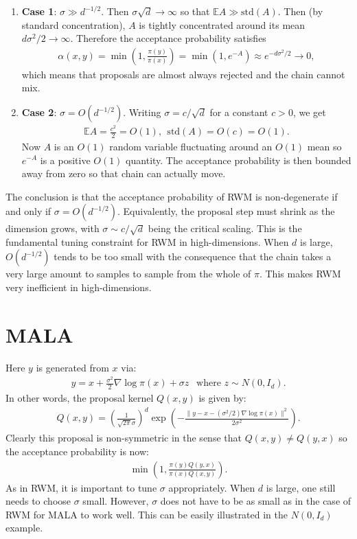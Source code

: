 \documentclass{scrartcl}
\newcommand{\E}{{\mathbb E}}
\begin{document}
\begin{enumerate}
\item \textbf{Case 1}: $\sigma \gg d^{-1/2}$. Then $\sigma \sqrt{d}
  \rightarrow \infty$ so that $\E A \gg \text{std}(A)$. Then (by
  standard concentration), $A$ is tightly concentrated around its mean
  $d\sigma^2/2 \rightarrow \infty$. Therefore the acceptance
  probability satisfies
  \begin{align*}
    \alpha(x, y) = \min \left(1, \frac{\pi(y)}{\pi(x)} \right) = \min
    \left(1, e^{-A} \right) \approx e^{-d\sigma^2/2} \rightarrow 0, 
  \end{align*}
  which means that proposals are almost always rejected and the chain
  cannot mix.
\item \textbf{Case 2}: $\sigma = O(d^{-1/2})$. Writing $\sigma =
  c/\sqrt{d}$ for a constant $c > 0$, we get
  \begin{align*}
    \E A = \frac{c^2}{2} = O(1), ~~ \text{std}(A) = O(c) = O(1). 
  \end{align*}
  Now $A$ is an $O(1)$ random variable fluctuating around an $O(1)$
  mean so $e^{-A}$ is a positive $O(1)$ quantity. The acceptance
  probability is then bounded away from zero so that chain can
  actually move. 
\end{enumerate}
The conclusion is that the acceptance probability of RWM is
non-degenerate if and only if $\sigma = O(d^{-1/2})$. Equivalently,
the proposal step must shrink as the dimension grows, with $\sigma
\sim c/\sqrt{d}$ being the critical scaling. This is the fundamental
tuning constraint for RWM in high-dimensions. When $d$ is large,
$O(d^{-1/2})$ tends to be too small with the consequence that the
chain takes a very large amount to samples to sample from the whole of
$\pi$. This makes RWM very inefficient in high-dimensions.


\section{MALA}

Here $y$ is generated from $x$ via:
\begin{align}\label{mala_p}
  y = x + \frac{\sigma^2}{2} \nabla \log \pi(x) + \sigma z ~~ \text{ where $z \sim N(0, I_d)$}. 
\end{align}
In other words, the proposal kernel $Q(x, y)$ is given by:
\begin{align*}
  Q(x, y) = \left(\frac{1}{\sqrt{2 \pi} \sigma} \right)^{d} \exp
  \left(-\frac{\|y - x - (\sigma^2/2) \nabla \log \pi(x)\|^2}{2 \sigma^2} \right). 
\end{align*}
Clearly this proposal is non-symmetric in the sense that $Q(x, y) \neq Q(y,
x)$ so the acceptance probability is now: 
\begin{align*}
  \min \left(1, \frac{\pi(y) Q(y, x)}{\pi(x) Q(x, y)} \right). 
\end{align*}
As in RWM, it is important to tune $\sigma$ appropriately. When $d$ is
large, one still needs to choose $\sigma$ small. However, $\sigma$
does not have to be as small as in the case of RWM for MALA to
work well. This can be easily illustrated in the $N(0, I_d)$ example.
\end{document}
